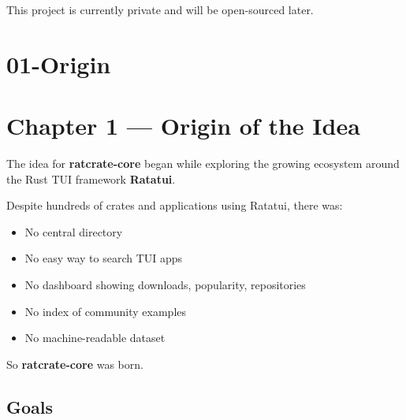 \documentclass[
  letterpaper,
  DIV=11,
  numbers=noendperiod]{scrreprt}
\providecommand{\tightlist}{%
  \setlength{\itemsep}{0pt}\setlength{\parskip}{0pt}}
\begin{document}
\begin{tcolorbox}[enhanced jigsaw, colbacktitle=quarto-callout-note-color!10!white, bottomtitle=1mm, breakable, colframe=quarto-callout-note-color-frame, coltitle=black, title=\textcolor{quarto-callout-note-color}{\faInfo}\hspace{0.5em}{Note}, left=2mm, opacitybacktitle=0.6, titlerule=0mm, opacityback=0, colback=white, bottomrule=.15mm, leftrule=.75mm, toprule=.15mm, toptitle=1mm, arc=.35mm, rightrule=.15mm]

This project is currently private and will be open-sourced later.

\end{tcolorbox}

\chapter{01-Origin}\label{origin}

\chapter{Chapter 1 --- Origin of the
Idea}\label{chapter-1-origin-of-the-idea}

The idea for \textbf{ratcrate-core} began while exploring the growing
ecosystem around the Rust TUI framework \textbf{Ratatui}.

Despite hundreds of crates and applications using Ratatui, there was:

\begin{itemize}
\tightlist
\item
  No central directory\\
\item
  No easy way to search TUI apps\\
\item
  No dashboard showing downloads, popularity, repositories\\
\item
  No index of community examples\\
\item
  No machine-readable dataset
\end{itemize}

So \textbf{ratcrate-core} was born.

\section{Goals}\label{goals}
\end{document}
